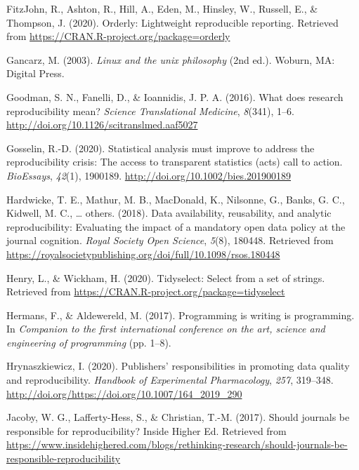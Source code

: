 \documentclass[12pt,twoside]{reedthesis}
\begin{document}
\hypertarget{ref-R-orderly}{}
FitzJohn, R., Ashton, R., Hill, A., Eden, M., Hinsley, W., Russell, E.,
\& Thompson, J. (2020). Orderly: Lightweight reproducible reporting.
Retrieved from \url{https://CRAN.R-project.org/package=orderly}

\hypertarget{ref-unix}{}
Gancarz, M. (2003). \emph{Linux and the unix philosophy} (2nd ed.).
Woburn, MA: Digital Press.

\hypertarget{ref-Goodman341ps12}{}
Goodman, S. N., Fanelli, D., \& Ioannidis, J. P. A. (2016). What does
research reproducibility mean? \emph{Science Translational Medicine},
\emph{8}(341), 1--6. \url{http://doi.org/10.1126/scitranslmed.aaf5027}

\hypertarget{ref-bioessays-gosselin}{}
Gosselin, R.-D. (2020). Statistical analysis must improve to address the
reproducibility crisis: The access to transparent statistics (acts) call
to action. \emph{BioEssays}, \emph{42}(1), 1900189.
\url{http://doi.org/10.1002/bies.201900189}

\hypertarget{ref-hardwicke2018data}{}
Hardwicke, T. E., Mathur, M. B., MacDonald, K., Nilsonne, G., Banks, G.
C., Kidwell, M. C., \ldots{} others. (2018). Data availability,
reusability, and analytic reproducibility: Evaluating the impact of a
mandatory open data policy at the journal cognition. \emph{Royal Society
Open Science}, \emph{5}(8), 180448. Retrieved from
\url{https://royalsocietypublishing.org/doi/full/10.1098/rsos.180448}

\hypertarget{ref-R-tidyselect}{}
Henry, L., \& Wickham, H. (2020). Tidyselect: Select from a set of
strings. Retrieved from
\url{https://CRAN.R-project.org/package=tidyselect}

\hypertarget{ref-hermans2017programming}{}
Hermans, F., \& Aldewereld, M. (2017). Programming is writing is
programming. In \emph{Companion to the first international conference on
the art, science and engineering of programming} (pp. 1--8).

\hypertarget{ref-hrynaszkiewicz2020publishers}{}
Hrynaszkiewicz, I. (2020). Publishers' responsibilities in promoting
data quality and reproducibility. \emph{Handbook of Experimental
Pharmacology}, \emph{257}, 319--348.
\url{http://doi.org/https://doi.org/10.1007/164_2019_290}

\hypertarget{ref-higher-ed}{}
Jacoby, W. G., Lafferty-Hess, S., \& Christian, T.-M. (2017). Should
journals be responsible for reproducibility? Inside Higher Ed. Retrieved
from
\url{https://www.insidehighered.com/blogs/rethinking-research/should-journals-be-responsible-reproducibility}
\end{document}
